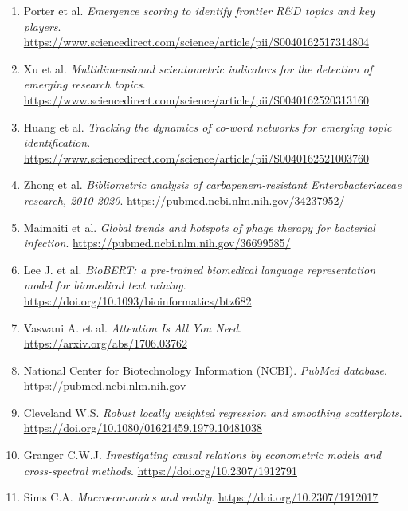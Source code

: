 \begin{enumerate}
\item Porter et al. \emph{Emergence scoring to identify frontier R\&D topics and key players}. \url{https://www.sciencedirect.com/science/article/pii/S0040162517314804}
\item Xu et al. \emph{Multidimensional scientometric indicators for the detection of emerging research topics}. \url{https://www.sciencedirect.com/science/article/pii/S0040162520313160}
\item Huang et al. \emph{Tracking the dynamics of co-word networks for emerging topic identification}. \url{https://www.sciencedirect.com/science/article/pii/S0040162521003760}
\item Zhong et al. \emph{Bibliometric analysis of carbapenem-resistant Enterobacteriaceae research, 2010-2020}. \url{https://pubmed.ncbi.nlm.nih.gov/34237952/}
\item Maimaiti et al. \emph{Global trends and hotspots of phage therapy for bacterial infection}. \url{https://pubmed.ncbi.nlm.nih.gov/36699585/}
\item Lee J. et al. \emph{BioBERT: a pre-trained biomedical language representation model for biomedical text mining}. \url{https://doi.org/10.1093/bioinformatics/btz682}
\item Vaswani A. et al. \emph{Attention Is All You Need}. \url{https://arxiv.org/abs/1706.03762}
\item National Center for Biotechnology Information (NCBI). \emph{PubMed database}. \url{https://pubmed.ncbi.nlm.nih.gov}
\item Cleveland W.S. \emph{Robust locally weighted regression and smoothing scatterplots}. \url{https://doi.org/10.1080/01621459.1979.10481038}
\item Granger C.W.J. \emph{Investigating causal relations by econometric models and cross-spectral methods}. \url{https://doi.org/10.2307/1912791}
\item Sims C.A. \emph{Macroeconomics and reality}. \url{https://doi.org/10.2307/1912017}
\end{enumerate}
